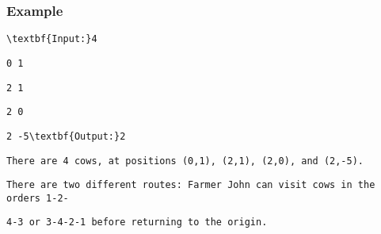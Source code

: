 \subsubsection{Example}
\begin{verbatim}
\textbf{Input:}4 \end{verbatim}
\begin{verbatim}
0 1\end{verbatim}
\begin{verbatim}
2 1 \end{verbatim}
\begin{verbatim}
2 0 \end{verbatim}
\begin{verbatim}
2 -5\textbf{Output:}2\end{verbatim}
\begin{verbatim}
There are 4 cows, at positions (0,1), (2,1), (2,0), and (2,-5).\end{verbatim}
\begin{verbatim}
There are two different routes: Farmer John can visit cows in the orders 1-2-\end{verbatim}
\begin{verbatim}
4-3 or 3-4-2-1 before returning to the origin.\end{verbatim}